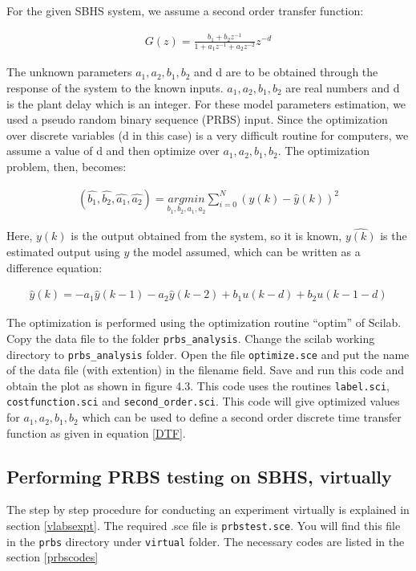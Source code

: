 For the given SBHS system, we assume a second order transfer function:

\begin{align}\label{DTF}
G(z)=\frac{b_{1}+b_{2}z^{-1}}{1+a_{1}z^{-1}+a_{2}z^{-2}}z^{-d}
\end{align}


The unknown parameters $a_1, a_2, b_1, b_2$ and d are to be obtained through the response of the system to the known inputs.  $a_1, a_2, b_1, b_2$ are real numbers and d is the plant delay which is an integer.  For these model parameters estimation, we used a pseudo random binary sequence (PRBS) input. Since the optimization over discrete variables (d in this case) is a very difficult routine for computers, we assume a value of d and then optimize over  $a_1, a_2, b_1, b_2$. The optimization problem, then, becomes:


\begin{align}
(\hat{b_1}, \hat{b_2}, \hat{a_1}, \hat{a_2})=\underset{b_1, b_2, a_1, a_2}{argmin}\sum_{i=0}^{N}(y(k)-\hat{y}(k))^{2}
\end{align}


Here, $y(k)$ is the output obtained from the system, so it is known, $\hat{y(k)}$ is the estimated output using $y$ the model assumed, which can be written as a difference equation:

\begin{align}
\hat{y}(k) = -a_1\hat{y}(k - 1) - a_2\hat{y}(k - 2) + b_1 u(k - d) + b_2 u(k - 1 - d)
\end{align}

The optimization is performed using the optimization routine “optim” of Scilab. Copy the  data file to the folder {\tt prbs\_analysis}. Change the scilab working directory to {\tt prbs\_analysis} folder. Open the file {\tt optimize.sce} and put the name of the data file (with extention) in the filename field. Save and run this code and obtain the plot as shown in figure 4.3. This code uses the routines {\tt label.sci}, {\tt costfunction.sci} and {\tt second\_order.sci}. This code will give optimized values for $a_1, a_2, b_1, b_2$ which can be used to define a second order discrete time transfer function as given in equation \ref{DTF}.





\subsection{Performing PRBS testing on SBHS, virtually}
The step by step procedure for conducting an experiment virtually is explained in section \ref{vlabsexpt}. The required .sce file is {\tt prbstest.sce}.  You will find this file in the {\tt prbs} directory under {\tt virtual} folder. The necessary codes are listed in the section \ref{prbscodes}


